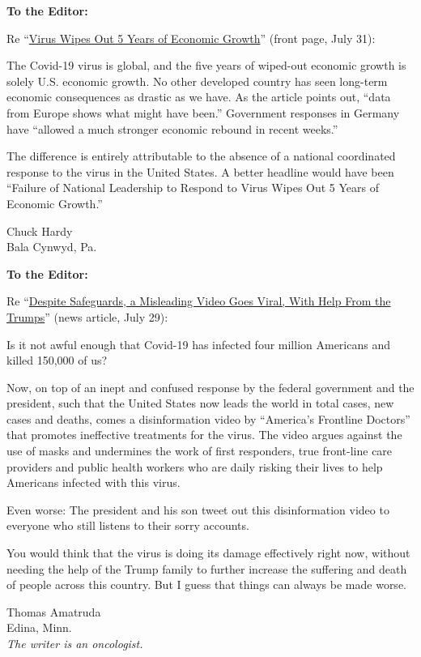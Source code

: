 \textbf{To the Editor:}

Re
``\href{https://www.nytimes.com/2020/07/30/business/economy/q2-gdp-coronavirus-economy.html}{Virus
Wipes Out 5 Years of Economic Growth}'' (front page, July 31):

The Covid-19 virus is global, and the five years of wiped-out economic
growth is solely U.S. economic growth. No other developed country has
seen long-term economic consequences as drastic as we have. As the
article points out, ``data from Europe shows what might have been.''
Government responses in Germany have ``allowed a much stronger economic
rebound in recent weeks.''

The difference is entirely attributable to the absence of a national
coordinated response to the virus in the United States. A better
headline would have been ``Failure of National Leadership to Respond to
Virus Wipes Out 5 Years of Economic Growth.''

Chuck Hardy\\
Bala Cynwyd, Pa.

\textbf{To the Editor:}

Re
``\href{https://www.nytimes.com/2020/07/28/technology/virus-video-trump.html}{Despite
Safeguards, a Misleading Video Goes Viral, With Help From the Trumps}''
(news article, July 29):

Is it not awful enough that Covid-19 has infected four million Americans
and killed 150,000 of us?

Now, on top of an inept and confused response by the federal government
and the president, such that the United States now leads the world in
total cases, new cases and deaths, comes a disinformation video by
``America's Frontline Doctors'' that promotes ineffective treatments for
the virus. The video argues against the use of masks and undermines the
work of first responders, true front-line care providers and public
health workers who are daily risking their lives to help Americans
infected with this virus.

Even worse: The president and his son tweet out this disinformation
video to everyone who still listens to their sorry accounts.

You would think that the virus is doing its damage effectively right
now, without needing the help of the Trump family to further increase
the suffering and death of people across this country. But I guess that
things can always be made worse.

Thomas Amatruda\\
Edina, Minn.\\
\emph{The writer is an oncologist.}

